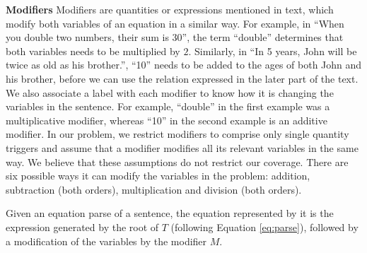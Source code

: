   \noindent \textbf{Modifiers} Modifiers are quantities or expressions
  mentioned in text, which modify both variables of an equation in a
  similar way. For example, in ``When you double two numbers, their
  sum is 30'', the term ``double'' determines that both variables
  needs to be multiplied by $2$. Similarly, in ``In 5 years, John will
  be twice as old as his brother.'', ``10'' needs to be added to the
  ages of both John and his brother, before we can use the relation
  expressed in the later part of the text. We also associate a label
  with each modifier to know how it is changing the variables in the
  sentence. For example, ``double'' in the first example was a
  multiplicative modifier, whereas ``10'' in the second example is an
  additive modifier. In our problem, we restrict modifiers to comprise
  only single quantity triggers and assume that a modifier modifies
  all its relevant variables in the same way. We believe that these
  assumptions do not restrict our coverage. There are six possible ways
  it can modify the variables in the problem: addition, subtraction
  (both orders), multiplication and division (both orders).

  Given an equation parse of a sentence, the equation represented by
  it is the expression generated by the root of $T$ (following
  Equation \ref{eq:parse}), followed by a modification of the
  variables by the modifier $M$.



